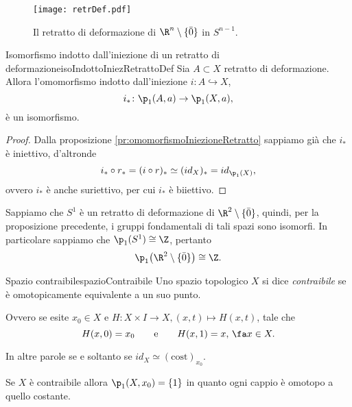 \begin{figure}[tp]
	\begin{centering}
		\texttt{[image: retrDef.pdf]}
		\caption{Il retratto di deformazione di \(\R^n \setminus\{\bar{0}\}\) in \(S^{n-1}\).}
		\label{fig:retrDef}
	\end{centering}
\end{figure}

\begin{prop}{Isomorfismo indotto dall'iniezione di un retratto di deformazione}{isoIndottoIniezRetrattoDef}
	Sia \(A\subset X\) retratto di deformazione.
	Allora l'omomorfismo indotto dall'iniezione \(i\colon A \hookrightarrow X\),
	\[
		i_* \colon \p_1(A,a) \to \p_1(X,a),
	\]
	è un isomorfismo.
\end{prop}

\begin{proof}
	Dalla proposizione \ref{pr:omomorfismoIniezioneRetratto} sappiamo già che \(i_*\) è iniettivo, d'altronde
	\[
		i_* \circ r_* = (i\circ r)_* \simeq (id_X)_* = id_{\p_1(X)},
	\]
	ovvero \(i_*\) è anche suriettivo, per cui \(i_*\) è biiettivo.
\end{proof}

\begin{ese}
	Sappiamo che \(S^1\) è un retratto di deformazione di \(\R^2\setminus \{\bar{0}\}\), quindi, per la proposizione precedente, i gruppi fondamentali di tali spazi sono isomorfi.
	In particolare sappiamo che \(\p_1(S^1) \cong \Z\), pertanto
	\[
		\p_1\big(\R^2\setminus\{\bar{0}\}\big) \cong \Z.
	\]
\end{ese}

\begin{defn}{Spazio contraibile}{spazioContraibile}
	Uno spazio topologico \(X\) si dice \emph{contraibile} se è omotopicamente equivalente a un suo punto.

	Ovvero se esite \(x_0\in X\) e \(H\colon X \times I \to X, (x,t) \mapsto H(x,t)\), tale che
	\[
		H(x,0) = x_0 \qquad\text{e}\qquad H(x,1) = x,\,\fa x \in X.
	\]
\end{defn}

\begin{oss}
	In altre parole se e soltanto se \(id_X \simeq (\text{cost})_{x_0}\).
\end{oss}

\begin{oss}
	Se \(X\) è contraibile allora \(\p_1(X,x_0) = \{1\}\) in quanto ogni cappio è omotopo a quello costante.
\end{oss}

